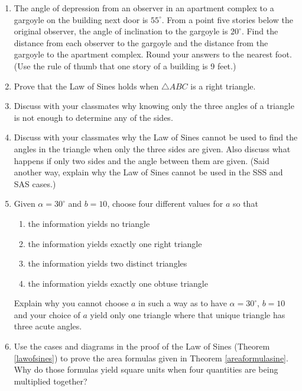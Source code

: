 \begin{enumerate}
\item  The angle of depression from an observer in an apartment complex to a gargoyle on the building next door is $55^{\circ}$.  From a point five stories below the original observer, the angle of inclination to the gargoyle is $20^{\circ}$.  Find the distance from each observer to the gargoyle and the distance from the gargoyle to the apartment complex.  Round your answers to the nearest foot.  (Use the rule of thumb that one story of a building is 9 feet.)  

\item Prove that the Law of Sines holds when $\triangle ABC$ is a right triangle.

\item Discuss with your classmates why knowing only the three angles of a triangle is not enough to determine any of the sides.

\item Discuss with your classmates why the Law of Sines cannot be used to find the angles in the triangle when only the three sides are given.  Also discuss what happens if only two sides and the angle between them are given.  (Said another way, explain why the Law of Sines cannot be used in the SSS and SAS cases.)

\item Given $\alpha = 30^{\circ}$ and $b = 10$, choose four different values for $a$ so that 

\begin{enumerate}

\item the information yields no triangle
\item the information yields exactly one right triangle
\item the information yields two distinct triangles
\item the information yields exactly one obtuse triangle

\end{enumerate}

Explain why you cannot choose $a$ in such a way as to have $\alpha = 30^{\circ}$, $b = 10$ and your choice of $a$ yield only one triangle where that unique triangle has three acute angles.

\item Use the cases and diagrams in the proof of the Law of Sines (Theorem \ref{lawofsines}) to prove the area formulas given in Theorem \ref{areaformulasine}.  Why do those formulas yield square units when four quantities are being multiplied together?

\setcounter{HW}{\value{enumi}}

\end{enumerate}

